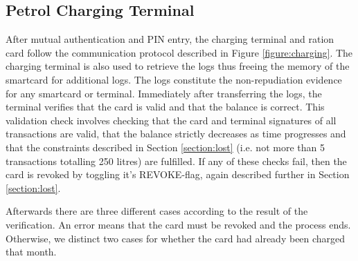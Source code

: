 \documentclass[a4paper,10pt]{llncs}
\begin{document}
\subsection{Petrol Charging Terminal}
\label{subsection:chargingterminal}
After mutual authentication and PIN entry, the charging terminal and ration card follow the communication protocol described in Figure \ref{figure:charging}. The charging terminal is also used to retrieve the logs thus freeing the memory of the smartcard for additional logs. The logs constitute the non-repudiation evidence for any smartcard or terminal. Immediately after transferring the logs, the terminal verifies that the card is valid and that the balance is correct. This validation check involves checking that the card and terminal signatures of all transactions are valid, that the balance strictly decreases as time progresses and that the constraints described in Section \ref{section:lost} (i.e. not more than 5 transactions totalling 250 litres) are fulfilled. If any of these checks fail, then the card is revoked by toggling it's REVOKE-flag, again described further in Section \ref{section:lost}.

Afterwards there are three different cases according to the result of the verification. An error means that the card must be revoked and the process ends. Otherwise, we distinct two cases for whether the card had already been charged that month. 

\usetikzlibrary{matrix,shapes,arrows,positioning,chains, calc}
\end{document}
